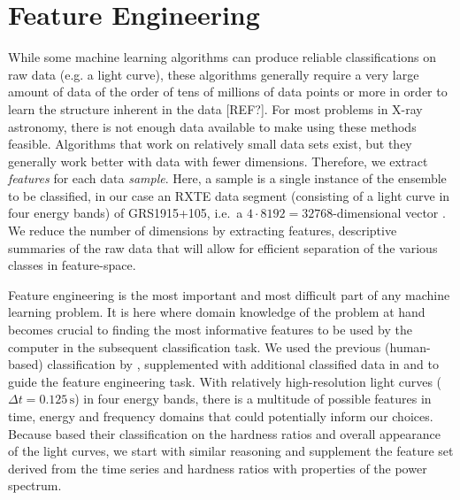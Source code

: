 \documentclass[12pt]{emulateapj}
\begin{document}
\section{Feature Engineering}
\label{sec:featureengineering}

While some machine learning algorithms can produce reliable classifications on raw data (e.g. a light curve), these algorithms generally require a very large amount of data of the order of tens of millions of data points or more in order to learn the structure inherent in the data [REF?].
For most problems in X-ray astronomy, there is not enough data available to make using these methods feasible. Algorithms that work on relatively small data sets exist, but they generally work better with data with fewer dimensions. Therefore, we extract \textit{features} for each data \textit{sample}. 
Here, a sample is a single instance of the ensemble to be classified, in our case an RXTE data segment (consisting of a light curve in four energy bands) of GRS1915+105, i.e.\ a $4 \cdot 8192 = 32768$-dimensional vector . We reduce the number of dimensions by extracting features, descriptive summaries of the raw data that will allow for efficient separation of the various classes in feature-space. %

Feature engineering is the most important and most difficult part of any machine learning problem. It is here where domain knowledge of the problem at hand becomes crucial to finding the most informative features to be used by the computer in the subsequent classification task. 
We used the previous (human-based) classification by \citet{belloni2000}, supplemented with additional classified data in \citet{kleinwolt2002} and \citet{hannikainen2003} to guide the feature engineering task. With relatively high-resolution light curves ($\Delta t = 0.125 \,\mathrm{s}$) in four energy bands, there is a multitude of possible features in time, energy and frequency domains that could potentially inform our choices. Because \citet{belloni2000} based their classification on the hardness ratios and overall appearance of the light curves, we start with similar reasoning and supplement the feature set derived from the time series and hardness ratios with properties of the power spectrum.
\end{document}
